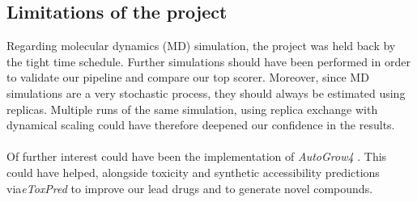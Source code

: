 \documentclass[11pt, letterpaper, titlepage]{article}
\renewcommand{\cite}{\parencite}
\begin{document}
\subsection{Limitations of the project}
Regarding molecular dynamics (MD) simulation, the project was held back by the tight time schedule. Further simulations should have been performed in order to validate our pipeline and compare our top scorer. Moreover, since MD simulations are a very stochastic process, they should always be estimated using replicas. Multiple runs of the same simulation, using replica exchange with dynamical scaling \cite{REDS} could have therefore deepened our confidence in the results.\\
\\
Of further interest could have been the implementation of \textit{AutoGrow4} \cite{packageAutogrow4}. This could have helped, alongside toxicity and synthetic accessibility predictions via\textit{eToxPred} to improve our lead drugs and to generate novel compounds.

\pagebreak
\FloatBarrier
\renewcommand{\bibname}{References}  %
\printbibliography
\end{document}
